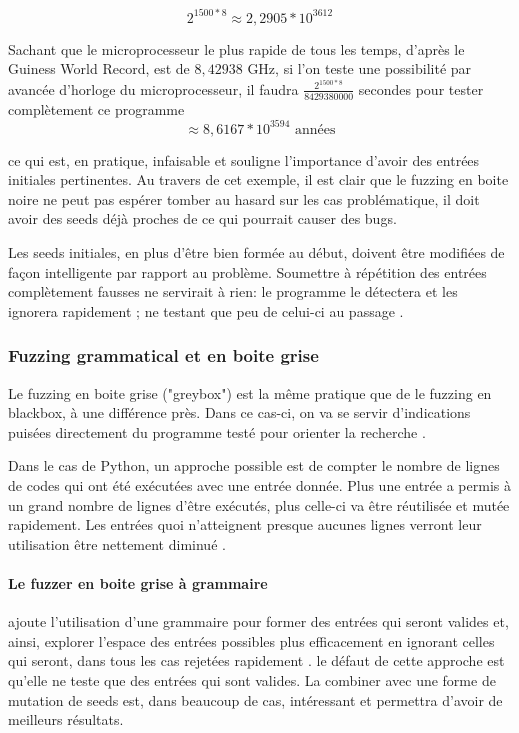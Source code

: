 \documentclass[a4paper]{report}
\begin{document}
$$2^{1500 * 8} \approx 2,2905 * 10^{3612}$$

Sachant que le microprocesseur le plus rapide de tous les temps, d'après le Guiness World Record, est de $8,42938$ GHz\cite{gwrcpu}, si l'on teste une possibilité par avancée d'horloge du microprocesseur, il faudra $\frac{2^{1500*8}}{ 8429380000}$ secondes pour tester complètement ce programme
$$\approx 8,6167 * 10^{3594} \text{ années}$$

ce qui est, en pratique, infaisable et souligne l'importance d'avoir des entrées initiales pertinentes.
Au travers de cet exemple, il est clair que le fuzzing en boite noire ne peut pas espérer tomber au hasard sur les cas problématique, il doit avoir des seeds déjà proches de ce qui pourrait causer des bugs.


Les seeds initiales, en plus d'être bien formée au début, doivent être modifiées de façon intelligente par rapport au problème.
Soumettre à répétition des entrées complètement fausses ne servirait à rien: le programme le détectera et les ignorera rapidement ; ne testant que peu de celui-ci au passage \cite{Godefroid2020}.

\subsubsection{Fuzzing grammatical et en boite grise}

Le fuzzing en boite grise ("greybox") est la même pratique que de le fuzzing en blackbox, à une différence près.
Dans ce cas-ci, on va se servir d’indications puisées directement du programme testé pour orienter la recherche \cite{fuzzingbook2022:GreyboxFuzzer}.

Dans le cas de Python, un approche possible est de compter le nombre de lignes de codes qui ont été exécutées avec une entrée donnée.
Plus une entrée a permis à un grand nombre de lignes d’être exécutés, plus celle-ci va être réutilisée et mutée rapidement.
Les entrées quoi n'atteignent presque aucunes lignes verront leur utilisation être nettement diminué \cite{fuzzingbook2022:GreyboxFuzzer}.

\paragraph{Le fuzzer en boite grise à grammaire} ajoute l'utilisation d'une grammaire pour former des entrées qui seront valides et, ainsi, explorer l'espace des entrées possibles plus efficacement en ignorant celles qui seront, dans tous les cas rejetées rapidement \cite{fuzzingbook2022:GreyboxGrammarFuzzer}.
le défaut de cette approche est qu'elle ne teste que des entrées qui sont valides.
La combiner avec une forme de mutation de seeds est, dans beaucoup de cas, intéressant et permettra d'avoir de meilleurs résultats.
\end{document}
